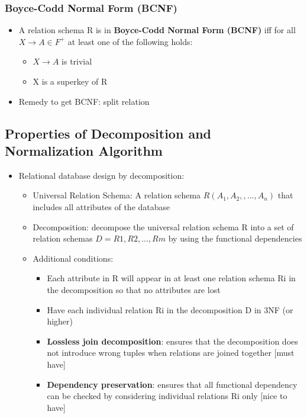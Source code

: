 \subsubsection{Boyce-Codd Normal Form (BCNF)}
\begin{itemize}
    \item A relation schema R is in \textbf{Boyce-Codd Normal Form (BCNF)} iff for all $X\rightarrow A \in F^+$ at least one of the following holds:
    \begin{itemize}
        \item $X\rightarrow A$ is trivial
        \item X is a superkey of R  
    \end{itemize}
    \item Remedy to get BCNF: split relation
\end{itemize}

\subsection{Properties of Decomposition and Normalization Algorithm}
\begin{itemize}
    \item Relational database design by decomposition:
    \begin{itemize}
        \item Universal Relation Schema: A relation schema $R(A_1,A_2,,...,A_n)$ that includes all attributes of the database
        \item Decomposition: decompose the universal relation schema R into a set of relation schemas $D=R1,R2,...,Rm$ by using the functional dependencies
        \item Additional conditions:
        \begin{itemize}
            \item Each attribute in R will appear in at least one relation schema Ri in the decomposition so that no attributes are lost
            \item Have each individual relation Ri in the decomposition D in 3NF (or higher)
            \item \textbf{Lossless join decomposition}: ensures that the decomposition does not introduce wrong tuples when relations are joined together [must have]
            \item \textbf{Dependency preservation}: ensures that all functional dependency can be checked by considering individual relations Ri only [nice to have]
        \end{itemize}
    \end{itemize}
\end{itemize}


